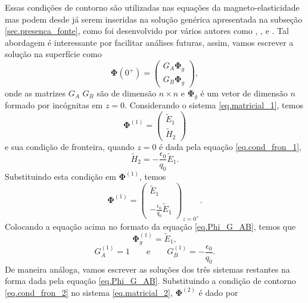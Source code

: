 Essas condi\c{c}\~oes de contorno s\~ao utilizadas nas equa\c{c}\~oes da magneto-elasticidade mas podem desde j\'a serem inseridas na solu\c{c}\~ao gen\'erica apresentada na subse\c{c}\~ao \ref{sec.presenca_fonte}, como foi desenvolvido por v\'arios autores como \cite{White_Zhou_2006}, \cite{Azeredo_2013}, \cite{miranda_2016} e \cite{oliveira_2018}. Tal abordagem \'e interessante por facilitar an\'alises futuras, assim, vamos escrever a solu\c{c}\~ao na superf\'icie como
\begin{equation}\label{eq.Phi_G_AB}
\mathbf{\Phi}(0^+)=
\begin{pmatrix}
G_A\mathbf{\Phi}_g\\
G_B\mathbf{\Phi}_g
\end{pmatrix},
\end{equation}
onde as matrizes $G_A$ $G_B$ s\~ao de dimens\~ao $n\times n$ e $\mathbf{\Phi}_g$ \'e um vetor de dimens\~ao $n$ formado por inc\'ognitas em $z=0$.
Considerando o sistema \ref{eq.matricial_1}, temos
\begin{equation*}
\mathbf{\Phi}^{(1)}=
\begin{pmatrix}
\tilde{E}_1\\
\tilde{H}_2
\end{pmatrix}
\end{equation*}
e sua condi\c{c}\~ao de fronteira, quando $z=0$ \'e dada pela equa\c{c}\~ao \ref{eq.cond_fron_1}, 
\begin{equation*}
\tilde{H}_2=-\frac{\epsilon_0}{q_0}\tilde{E}_1.
\end{equation*}
Substituindo esta condi\c{c}\~ao em $\mathbf{\Phi}^{(1)}$, temos
\begin{equation*}
\mathbf{\Phi}^{(1)}=
\begin{pmatrix}
\tilde{E}_1\\\\
-\frac{\epsilon_0}{q_0}\tilde{E}_1
\end{pmatrix}_{z=0^+}.
\end{equation*}
Colocando a equa\c{c}\~ao acima no formato da equa\c{c}\~ao \ref{eq.Phi_G_AB}, temos que
\begin{equation*}
\mathbf{\Phi}_g^{(1)}=\tilde{E}_1,
\end{equation*}
\begin{equation*}
G_A^{(1)}=1\qquad\text{e}\qquad G_B^{(1)}=-\frac{\epsilon_0}{q_0}.
\end{equation*}
De maneira an\'aloga, vamos escrever as solu\c{c}\~oes dos tr\^es sistemas restantes na forma dada pela equa\c{c}\~ao \ref{eq.Phi_G_AB}. Substituindo a condi\c{c}\~ao de contorno \ref{eq.cond_fron_2} no sistema \ref{eq.matricial_2}, $\mathbf{\Phi}^{(2)}$ \'e dado por
